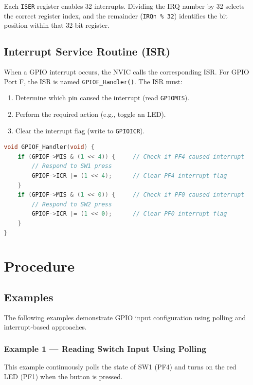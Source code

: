 \noindent
Each \texttt{ISER} register enables 32 interrupts.  
Dividing the IRQ number by 32 selects the correct register index, and the remainder (\texttt{IRQn \% 32}) identifies the bit position within that 32-bit register.
\subsection{Interrupt Service Routine (ISR)}

When a GPIO interrupt occurs, the NVIC calls the corresponding ISR. For GPIO Port F, the ISR is named \texttt{GPIOF\_Handler()}. The ISR must:

\begin{enumerate}[nosep]
  \item Determine which pin caused the interrupt (read \texttt{GPIOMIS}).
  \item Perform the required action (e.g., toggle an LED).
  \item Clear the interrupt flag (write to \texttt{GPIOICR}).
\end{enumerate}

\begin{lstlisting}[caption={GPIO Port F ISR Template}, language=C]
void GPIOF_Handler(void) {
    if (GPIOF->MIS & (1 << 4)) {     // Check if PF4 caused interrupt
        // Respond to SW1 press
        GPIOF->ICR |= (1 << 4);      // Clear PF4 interrupt flag
    }
    if (GPIOF->MIS & (1 << 0)) {     // Check if PF0 caused interrupt
        // Respond to SW2 press
        GPIOF->ICR |= (1 << 0);      // Clear PF0 interrupt flag
    }
}
\end{lstlisting}


\newpage
\section{Procedure}

\subsection{Examples}

The following examples demonstrate GPIO input configuration using polling and interrupt-based approaches.

\subsubsection{Example 1 — Reading Switch Input Using Polling}

This example continuously polls the state of SW1 (PF4) and turns on the red LED (PF1) when the button is pressed.

